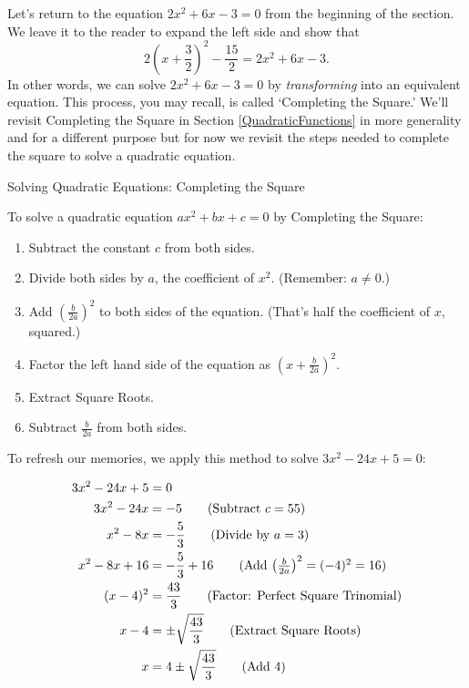 Let's return to the equation $2x^2 + 6x - 3 = 0$ from the beginning of the section.  We leave it to the reader to expand the left side and show that \[2\left(x + \dfrac{3}{2}\right)^2 - \dfrac{15}{2} =  2x^2 + 6x - 3. \] In other words, we can solve $2x^2 + 6x - 3 = 0$  by \textit{transforming} into an equivalent equation. This process, you may recall, is called `Completing the Square.'  We'll revisit Completing the Square in Section \ref{QuadraticFunctions} in more generality and for a different purpose but for now we revisit the steps needed to complete the square to solve a quadratic equation.

\begin{floatbox}[label=box:completesquareeqns]{Solving Quadratic Equations: Completing the Square}

To solve a quadratic equation $ax^2 + bx + c = 0$ by Completing the Square:

\begin{enumerate}

\item  Subtract the constant $c$ from both sides.
\item  Divide both sides by $a$,  the coefficient of $x^2$.  (Remember:  $a \neq 0$.)
\item  Add $\left(\frac{b}{2a}\right)^2$ to both sides of the equation. (That's half the coefficient of $x$, squared.)
\item  Factor the left hand side of the equation as $\left(x + \frac{b}{2a}\right)^2$.
\item  Extract Square Roots.
\item  Subtract $\frac{b}{2a}$ from both sides.

\end{enumerate}

\end{floatbox}

To refresh our memories, we apply this method to solve $3x^2 - 24x + 5 = 0$:

\begin{align*}
3x^2 - 24x + 5 & = 0 \\
3x^2 - 24x  & = -5 \tag{Subtract  $c = 55$} \\
x^2 - 8x & = -\dfrac{5}{3} \tag{Divide by $a = 3$} \\
x^2 - 8x + 16 & = -\dfrac{5}{3} + 16 \tag{Add $\left(\frac{b}{2a}\right)^2 = (-4)^2 = 16$} \\
(x - 4)^2 & = \dfrac{43}{3} \tag{Factor: Perfect Square Trinomial} \\
x - 4 & = \pm \sqrt{\dfrac{43}{3}} \tag{Extract Square Roots} \\
x & = 4 \pm \sqrt{\dfrac{43}{3}} \tag{Add $4$} \\
\end{align*}


